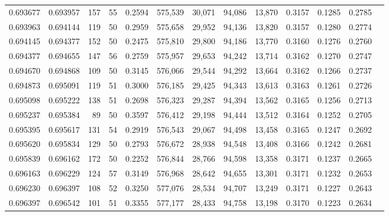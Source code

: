 \begin{tabular}{rrrrrrrrrrrrr}
0.693677 & 0.693957 &   157 &  55 &                                     0.2594 & 575,539 &  30,071 &  94,086 &  13,870 & 0.3157 & 0.1285 & 0.2785 \\
0.693963 & 0.694144 &   119 &  50 &                                     0.2959 & 575,658 &  29,952 &  94,136 &  13,820 & 0.3157 & 0.1280 & 0.2774 \\
0.694145 & 0.694377 &   152 &  50 &                                     0.2475 & 575,810 &  29,800 &  94,186 &  13,770 & 0.3160 & 0.1276 & 0.2760 \\
0.694377 & 0.694655 &   147 &  56 &                                     0.2759 & 575,957 &  29,653 &  94,242 &  13,714 & 0.3162 & 0.1270 & 0.2747 \\
0.694670 & 0.694868 &   109 &  50 &                                     0.3145 & 576,066 &  29,544 &  94,292 &  13,664 & 0.3162 & 0.1266 & 0.2737 \\
0.694873 & 0.695091 &   119 &  51 &                                     0.3000 & 576,185 &  29,425 &  94,343 &  13,613 & 0.3163 & 0.1261 & 0.2726 \\
0.695098 & 0.695222 &   138 &  51 &                                     0.2698 & 576,323 &  29,287 &  94,394 &  13,562 & 0.3165 & 0.1256 & 0.2713 \\
0.695237 & 0.695384 &    89 &  50 &                                     0.3597 & 576,412 &  29,198 &  94,444 &  13,512 & 0.3164 & 0.1252 & 0.2705 \\
0.695395 & 0.695617 &   131 &  54 &                                     0.2919 & 576,543 &  29,067 &  94,498 &  13,458 & 0.3165 & 0.1247 & 0.2692 \\
0.695620 & 0.695834 &   129 &  50 &                                     0.2793 & 576,672 &  28,938 &  94,548 &  13,408 & 0.3166 & 0.1242 & 0.2681 \\
0.695839 & 0.696162 &   172 &  50 &                                     0.2252 & 576,844 &  28,766 &  94,598 &  13,358 & 0.3171 & 0.1237 & 0.2665 \\
0.696163 & 0.696229 &   124 &  57 &                                     0.3149 & 576,968 &  28,642 &  94,655 &  13,301 & 0.3171 & 0.1232 & 0.2653 \\
0.696230 & 0.696397 &   108 &  52 &                                     0.3250 & 577,076 &  28,534 &  94,707 &  13,249 & 0.3171 & 0.1227 & 0.2643 \\
0.696397 & 0.696542 &   101 &  51 &                                     0.3355 & 577,177 &  28,433 &  94,758 &  13,198 & 0.3170 & 0.1223 & 0.2634 \\

\end{tabular}
